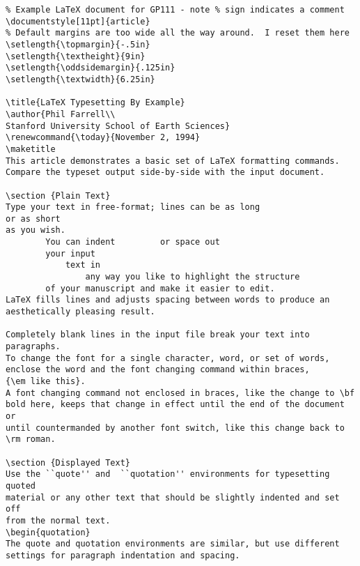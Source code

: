 \pagebreak
{}
\begin{verbatim}
% Example LaTeX document for GP111 - note % sign indicates a comment
\documentstyle[11pt]{article}
% Default margins are too wide all the way around.  I reset them here
\setlength{\topmargin}{-.5in}
\setlength{\textheight}{9in}
\setlength{\oddsidemargin}{.125in}
\setlength{\textwidth}{6.25in}

\title{LaTeX Typesetting By Example}
\author{Phil Farrell\\
Stanford University School of Earth Sciences}
\renewcommand{\today}{November 2, 1994}
\maketitle
This article demonstrates a basic set of LaTeX formatting commands.
Compare the typeset output side-by-side with the input document.

\section {Plain Text}
Type your text in free-format; lines can be as long
or as short
as you wish.
        You can indent         or space out
        your input 
            text in 
                any way you like to highlight the structure
        of your manuscript and make it easier to edit.
LaTeX fills lines and adjusts spacing between words to produce an
aesthetically pleasing result.

Completely blank lines in the input file break your text into
paragraphs.
To change the font for a single character, word, or set of words, 
enclose the word and the font changing command within braces, 
{\em like this}.
A font changing command not enclosed in braces, like the change to \bf 
bold here, keeps that change in effect until the end of the document or
until countermanded by another font switch, like this change back to 
\rm roman.

\section {Displayed Text}
Use the ``quote'' and  ``quotation'' environments for typesetting quoted
material or any other text that should be slightly indented and set off
from the normal text.
\begin{quotation}
The quote and quotation environments are similar, but use different 
settings for paragraph indentation and spacing.


\end{verbatim}
